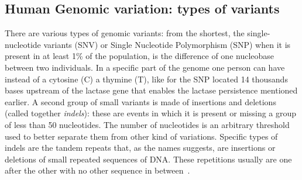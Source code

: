 \subsection{Human Genomic variation: types of variants}
There are various types of genomic variants: from the shortest, the single-nucleotide variants (SNV) or Single Nucleotide Polymorphism (SNP) when it is present in at least 1\% of the population, is the difference of one nucleobase between two individuals. In a specific part of the genome one person can have instead of a cytosine (C) a thymine (T), like for the SNP located 14 thousands bases upstream of the lactase gene that enables the lactase persistence mentioned earlier\cite{lactase_persistance}.
A second group of small variants is made of insertions and deletions (called together \emph{indels}): these are events in which it is present or missing a group of less than 50 nucleotides. The number of nucleotides is an arbitrary threshold used to better separate them from other kind of variations. Specific types of indels are the tandem repeats that, as the names suggests, are insertions or deletions of small repeated sequences of DNA. These repetitions usually are one after the other with no other sequence in between~\cite{nih_variation}.\\
